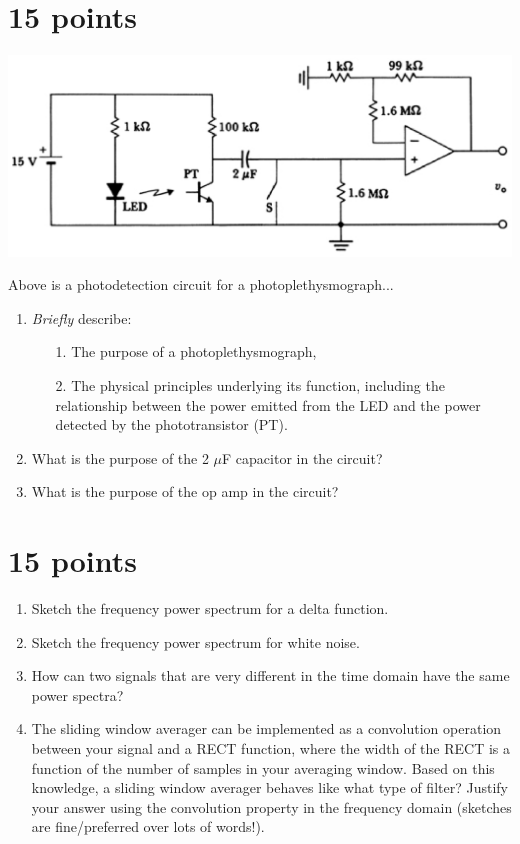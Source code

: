 \documentclass[12pt]{article}
\begin{document}


\clearpage



\section{15 points}

\begin{center}
\includegraphics[width=0.5\linewidth]{photo_detect_ckt.eps}
\end{center}

Above is a photodetection circuit for a photoplethysmograph...
\begin{enumerate}
    \item \emph{Briefly} describe:
        \begin{enumerate}
        \item[1.] The purpose of a photoplethysmograph, 
        \item[2.] The physical principles underlying its function, including the relationship between the power emitted from the LED and the power detected by the phototransistor (PT).
        \end{enumerate}
    \item What is the purpose of the 2 $\mu$F capacitor in the circuit?
    \item What is the purpose of the op amp in the circuit?
\end{enumerate}

\clearpage



\clearpage



\section{15 points}

\begin{enumerate}
\item Sketch the frequency power spectrum for a delta function.
\item Sketch the frequency power spectrum for white noise.
\item How can two signals that are very different in the time domain have the
same power spectra?
\item The sliding window averager can be implemented as a convolution operation
between your signal and a RECT function, where the width of the RECT is a
function of the number of samples in your averaging window.  Based on this
knowledge, a sliding window averager behaves like what type of filter?  Justify
your answer using the convolution property in the frequency domain (sketches
are fine/preferred over lots of words!).
\end{enumerate}
\end{document}
